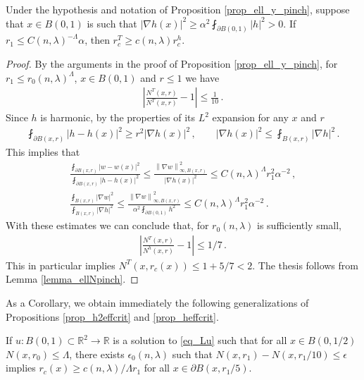 \documentclass[11pt]{article}
\begin{document}
\begin{proposition}
Under the hypothesis and notation of Proposition \ref{prop_ell_y_pinch}, suppose that $x\in B(0,1)$ is such that ${\left|{\nabla h(x)}\right|}^2\geq \alpha^2 \fint_{\partial B(0,1)} {\left|h\right|}^2>0$. 
  If $r_1\leq C(n,\lambda)^{-\Lambda} \alpha$, then $r_c^T\geq c(n,\lambda) r_c^h $.
\end{proposition}
\begin{proof}
 By the arguments in the proof of Proposition \ref{prop_ell_y_pinch}, for $r_1\leq r_0(n,\lambda)^\Lambda$, $x\in B(0,1)$ and $r\leq 1$ we have
 \begin{gather}
  {\left|{\frac{N^T(x,r)}{N^T(x,r)}-1}\right|}\leq \frac 1 {10}\, .
 \end{gather}
Since $h$ is harmonic, by the properties of its $L^2$ expansion for any $x$ and $r$
\begin{gather}
 \fint_{\partial B(x,r)} {\left|{h-h(x)}\right|}^2 \geq r^2 {\left|{\nabla h(x)}\right|}^2\, , \quad \quad {\left|{\nabla h(x)}\right|}^2 \leq \fint_{B(x,r)} {\left|{\nabla h}\right|}^2\, .
\end{gather}
This implies that
\begin{gather}
 \frac{\fint_{\partial B(x,r)} {\left|{w-w(x)}\right|}^2 }{\fint_{\partial B(x,r)} {\left|{h-h(x)}\right|}^2 }\leq \frac{{\left\|{\nabla w}\right\|}_{\infty, B(x,r)}^2 }{{\left|{\nabla h(x)}\right|}^2}\leq C(n,\lambda)^{\Lambda} r_1^2 \alpha^{-2}\, ,\\
 \frac{\fint_{B(x,r)} {\left|{\nabla w}\right|}^2}{\fint_{B(x,r)} {\left|{\nabla h}\right|}^2}\leq \frac{{\left\|{\nabla w}\right\|}_{\infty, B(x,r)} ^2 }{\alpha^2\fint_{\partial B(0,1)} h^2} \leq C(n,\lambda)^\Lambda r_1^2 \alpha^{-2}\, .
\end{gather}
 With these estimates we can conclude that, for $r_0(n,\lambda)$ is sufficiently small,
 \begin{gather}
  {\left|{\frac{N^T(x,r)}{N^h(x,r)} -1}\right|} \leq 1/7\, .
 \end{gather}
This in particular implies $N^T(x,r_c(x))\leq 1+5/7<2$. The thesis follows from Lemma \ref{lemma_ellNpinch}.
\end{proof}

As a Corollary, we obtain immediately the following generalizations of Propositions \ref{prop_h2effcrit} and \ref{prop_heffcrit}.
\begin{corollary}\label{cor_ell2effcrit}
 If $u:B(0,1)\subset {\mathbb{R}}^2\to {\mathbb{R}}$ is a  solution to \eqref{eq_Lu} such that for all $x\in B(0,1/2)$ $N(x,r_0)\leq \Lambda$, there exists $\epsilon_0(n,\lambda)$ such that $N(x,r_1)-N(x,r_1/10)\leq \epsilon$ implies $r_c(x)\geq c(n,\lambda)/\Lambda r_1$ for all $x\in \partial B(x,r_1/5)$.
\end{corollary}
\end{document}
